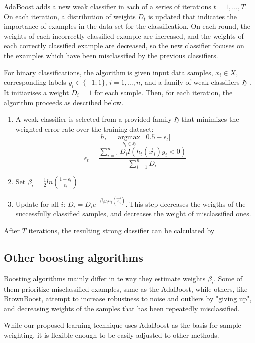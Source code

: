 AdaBoost adds a new weak classifier in each of a series of iterations  $t = 1,\ldots,T$. On each iteration, a distribution of weights $D_{t}$ is updated that indicates the importance of examples in the data set for the classification. On each round, the weights of each incorrectly classified example are increased, and the weights of each correctly classified example are decreased, so the new classifier focuses on the examples which have been misclassified by the previous classifiers.

	For binary classifications, the algorithm is given input data samples, $x_i \in X$,  corresponding labels $y_i\in \{-1;1\}$, $i = 1,\ldots,n$, and a family of weak classifiers $\mathfrak{H}$ .  It initiazises a weight $D_i=1$ for each sample. Then, for each iteration, the algorithm proceeds as described below.
\begin{enumerate}
\item {A weak classifier is selected from a provided family  $\mathfrak{H}$ that minimizes the weighted error rate over the training dataset:
$$
    h_{t} =\underset{h_{t} \in \mathfrak{H}}{\operatorname{argmax}}  \; \left| 0.5 - \epsilon_{t}\right|
$$}
$$
\epsilon_{t}=\frac{\sum_{i=1}^{n}D_i I(h_t(\vec{x}_i)y_i<0)}{\sum_{i=1}^{n}D_i}
$$
\item {Set $\beta_i=\frac{1}{2}ln\left(\frac{1-\epsilon_{t}}{\epsilon_{t}}\right)$}
\item{Update for all $i$: $D_i=D_i e^{-\beta_i y_i h_t(\vec{x_i})}$. This step decreases the weigths of the successfully classified samples, and decreases the weight of misclassified ones. }
\end{enumerate}

After $T$ iterations, the resulting strong classifier can be calculated by 

\subsection{Other boosting algorithms}
Boosting algorithms mainly differ in te way they estimate weights $\beta_i$. Some of them prioritize misclassified examples, same as the AdaBoost, while others, like BrownBoost, attempt to increase robustness to noise and outliers by "giving up", and decreasing weights of the samples that has been repeatedly misclassified. 

While our proposed learning technique uses AdaBoost as the basis for sample weighting, it is flexible enough to be easily adjusted to other methods. 

